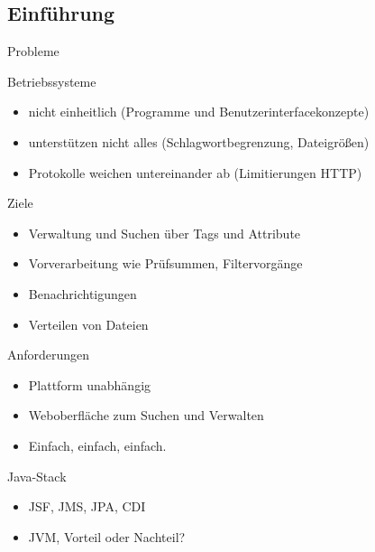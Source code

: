 \documentclass{beamer}
\begin{document}
\subsection{Einführung}
\begin{frame}{Probleme}
 
 \begin{block}{Betriebssysteme}
 	\begin{itemize}
 		\item nicht einheitlich (Programme und Benutzerinterfacekonzepte)
 		\item unterstützen nicht alles (Schlagwortbegrenzung, Dateigrößen)
 		\item Protokolle weichen untereinander ab (Limitierungen HTTP)
 	\end{itemize}
 \end{block}
 
 \begin{block}{Ziele}
 		\begin{itemize}
 		\item Verwaltung und Suchen über Tags und Attribute
 		\item Vorverarbeitung wie Prüfsummen, Filtervorgänge
 		\item Benachrichtigungen
 		\item Verteilen von Dateien
 	\end{itemize}
 \end{block}
 
\end{frame}


\begin{frame}

\begin{block}{Anforderungen}
	\begin{itemize}
		\item Plattform unabhängig 
		\item Weboberfläche zum Suchen und Verwalten
		\item Einfach, einfach, einfach.
	\end{itemize}
\end{block}

\begin{block}{Java-Stack}
	\begin{itemize}
		\item JSF, JMS, JPA, CDI
		\item JVM, Vorteil oder Nachteil?
	\end{itemize}
\end{block}



\end{frame}
\end{document}
